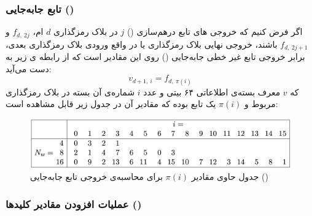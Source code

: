 \pagebreak
\subsubsection{
تابع جابه‌جایی ()
}
اگر فرض کنیم که خروجی های تابع درهم‌سازی () $j$ در بلاک رمزگذاری $d$ ام، 
$f_{d,\ 2j}$
و
$f_{d,\ 2j+1}$
باشند، خروجی نهایی بلاک رمزگذاری یا در واقع ورودی بلاک رمزگذاری بعدی، برابر خروجی تابع غیر خطی جابه‌جایی () روی این مقادیر است که از رابطه ی زیر به دست می‌آید:
$$v_{d+1,\ i} = f_{d,\ \pi(i)}$$
که
$v$
معرف بسته‌ی اطلاعاتی ۶۴ بیتی و عدد
 $i$
  شماره‌ی آن بسته در بلاک رمزگذاری مربوط و  $\pi(i)$ یک تابع بوده که مقادیر آن در جدول زیر قابل مشاهده است:

 \begin{figure}[H]
	\centering
	\includegraphics[width=15cm]{Images/Introduction/permutation_values.png}	
	\caption{جدول حاوی مقادیر
	$\pi(i)$
	برای محاسبه‌ی خروجی تابع جابه‌جایی () 
 }
\end{figure}
  
\subsubsection{
عملیات افزودن مقادیر کلید‌ها 
()
}

